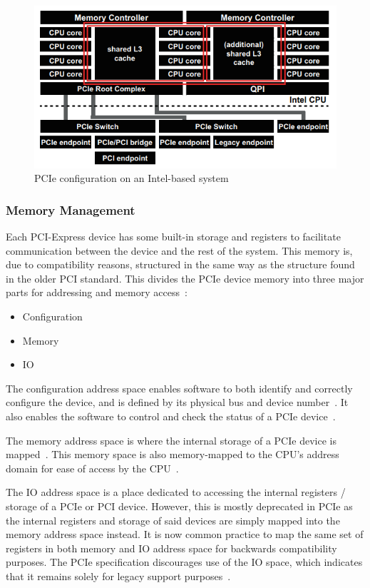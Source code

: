 \begin{figure}[htpb]
\includegraphics[width = \linewidth]{figures/PCIE-topology}
\caption{PCIe configuration on an Intel-based system~\cite{nakamura_thorough_2017}}
\label{fig:topology}
\end{figure}

\subsubsection{Memory Management}
\label{sec:memory}

Each PCI-Express device has some built-in storage and registers to facilitate communication between the device and the rest of the system. This memory is, due to compatibility reasons, structured in the same way as the structure found in the older PCI standard. This divides the PCIe device memory into three major parts for addressing and memory access~\cite{jackson_pci_2012}:

\begin{itemize}
\item Configuration
\item Memory
\item IO
\end{itemize}

The configuration address space enables software to both identify and correctly configure the device, and is defined by its physical bus and device number~\cite{oracle_inc_pci_2010}. It also enables the software to control and check the status of a PCIe device~\cite{jackson_pci_2012}.

The memory address space is where the internal storage of a PCIe device is mapped~\cite{jackson_pci_2012}. This memory space is also memory-mapped to the CPU's address domain for ease of access by the CPU~\cite{oracle_inc_pci_2010}.

The IO address space is a place dedicated to accessing the internal registers / storage of a PCIe or PCI device. However, this is mostly deprecated in PCIe as the internal registers and storage of said devices are simply mapped into the memory address space instead. It is now common practice to map the same set of registers in both memory and IO address space for backwards compatibility purposes. The PCIe specification discourages use of the IO space, which indicates that it remains solely for legacy support purposes~\cite{jackson_pci_2012}.

